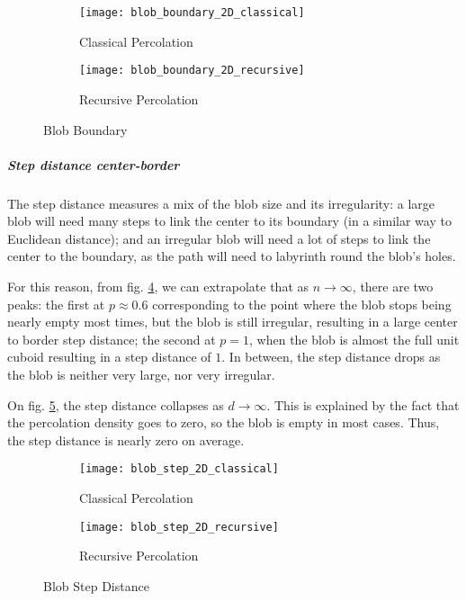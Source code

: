 \begin{figure}[!h]
	\centering
	\begin{subfigure}{.49\textwidth}
		\texttt{[image: blob\_boundary\_2D\_classical]}
		\centering
		\caption{Classical Percolation}
		\label{fig:blobBoundaryClassical}
	\end{subfigure}
	\begin{subfigure}{.49\textwidth}
		\texttt{[image: blob\_boundary\_2D\_recursive]}
		\centering
		\caption{Recursive Percolation}
		\label{fig:blobBoundaryRecursive}
	\end{subfigure}
	\caption{Blob Boundary}
	\label{fig:blobBoundary}
\end{figure}


\subparagraph{Step distance center-border}
The step distance measures a mix of the blob size and its irregularity: a large blob will need many steps to link the center to its boundary (in a similar way to Euclidean distance); and an irregular blob will need a lot of steps to link the center to the boundary, as the path will need to labyrinth round the blob's holes.

For this reason, from fig. \ref{fig:blobStepDistanceClassical}, we can extrapolate that as $n \to \infty$, there are two peaks: the first at $p \approx 0.6$ corresponding to the point where the blob stops being nearly empty most times, but the blob is still irregular, resulting in a large center to border step distance; the second at $p = 1$, when the blob is almost the full unit cuboid resulting in a step distance of $1$.
In between, the step distance drops as the blob is neither very large, nor very irregular.

On fig. \ref{fig:blobStepDistanceRecursive}, the step distance collapses as $d \to \infty$.
This is explained by the fact that the percolation density goes to zero, so the blob is empty in most cases.
Thus, the step distance is nearly zero on average.

\begin{figure}[!h]
	\centering
	\begin{subfigure}{.49\textwidth}
		\texttt{[image: blob\_step\_2D\_classical]}
		\centering
		\caption{Classical Percolation}
		\label{fig:blobStepDistanceClassical}
	\end{subfigure}
	\begin{subfigure}{.49\textwidth}
		\texttt{[image: blob\_step\_2D\_recursive]}
		\centering
		\caption{Recursive Percolation}
		\label{fig:blobStepDistanceRecursive}
	\end{subfigure}
	\caption{Blob Step Distance}
	\label{fig:blobStepDistance}
\end{figure}


